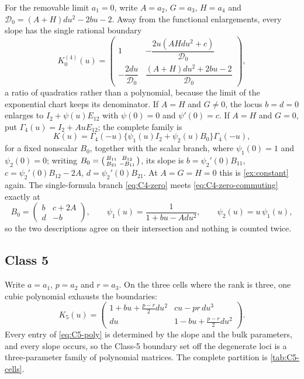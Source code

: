 \documentclass[11pt,reqno]{amsart}
\theoremstyle{plain}
\theoremstyle{definition}
\theoremstyle{remark}
\numberwithin{equation}{section}
\newcommand{\Id}{I_2}
\begin{document}
For the removable limit $a_1=0$, write $A=a_2$, $G=a_3$, $H=a_4$ and
$\mathcal D_0=(A+H)du^2-2bu-2$. Away from the functional enlargements, every
slope has the single rational boundary
\begin{equation}
K_0^{(4)}(u)=\begin{pmatrix}
1&-\dfrac{2u(AHdu^2+c)}{\mathcal D_0}\\[2mm]
-\dfrac{2du}{\mathcal D_0}&
\dfrac{(A+H)du^2+2bu-2}{\mathcal D_0}
\end{pmatrix},                                      \label{eq:C4-zero}
\end{equation}
a ratio of quadratics rather than a polynomial, because the limit of the
exponential chart keeps its denominator. If $A=H$ and $G\ne0$, the locus $b=d=0$
enlarges to $\Id+\psi(u)E_{12}$ with $\psi(0)=0$ and $\psi'(0)=c$. If $A=H$ and
$G=0$, put $\Gamma_4(u)=\Id+AuE_{12}$; the complete family is
\begin{equation}
K(u)=\Gamma_4(-u)\{\psi_1(u)\Id+\psi_2(u)B_0\}\Gamma_4(-u),
\label{eq:C4-zero-commuting}
\end{equation}
for a fixed nonscalar $B_0$, together with the scalar branch, where $\psi_1(0)=1$
and $\psi_2(0)=0$; writing
$B_0=\begin{psmallmatrix}B_{11}&B_{12}\\B_{21}&-B_{11}\end{psmallmatrix}$, its
slope is $b=\psi_2'(0)B_{11}$, $c=\psi_2'(0)B_{12}-2A$,
$d=\psi_2'(0)B_{21}$. At $A=G=H=0$ this is \cref{ex:constant} again. The
single-formula branch \cref{eq:C4-zero} meets \cref{eq:C4-zero-commuting}
exactly at
\begin{equation}
B_0=\begin{pmatrix}b&c+2A\\d&-b\end{pmatrix},\qquad
\psi_1(u)=\frac1{1+bu-Adu^2},\qquad \psi_2(u)=u\,\psi_1(u),
\label{eq:C4-overlap}
\end{equation}
so the two descriptions agree on their intersection and nothing is counted twice.

\subsection{Class 5}
\label{subsec:c5}

Write $a=a_1$, $p=a_2$ and $r=a_3$. On the three cells where the rank is three,
one cubic polynomial exhausts the boundaries:
\begin{equation}
K_5(u)=\begin{pmatrix}
1+bu+\frac{p-r}{2}du^2&cu-pr\,du^3\\
du&1-bu+\frac{p-r}{2}du^2
\end{pmatrix}.                                      \label{eq:C5-poly}
\end{equation}
Every entry of \cref{eq:C5-poly} is determined by the slope and the bulk
parameters, and every slope occurs, so the Class-5 boundary set off the
degenerate loci is a three-parameter family of polynomial matrices. The complete
partition is \cref{tab:C5-cells}.
\end{document}

